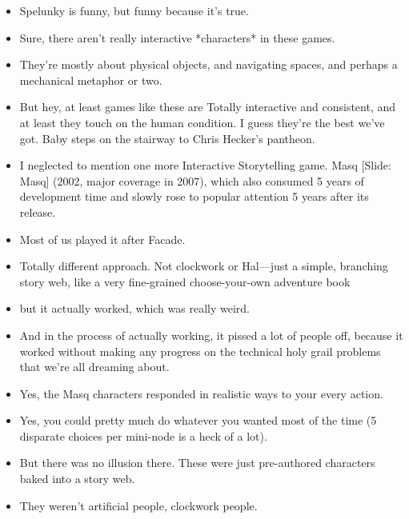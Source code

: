 \documentclass[12pt]{article}
\begin{document}
{\begin{itemize}
\item Spelunky is funny, but funny because it's true.

\item Sure, there aren't really interactive *characters* in these games.  

\item They're mostly about physical objects, and navigating spaces, and perhaps a mechanical metaphor or two.  

\item But hey, at least games like these are Totally interactive and consistent, and at least they touch on the human condition.  I guess they're the best we've got.  Baby steps on the stairway to Chris Hecker's pantheon.



\item I neglected to mention one more Interactive Storytelling game.  Masq [Slide: Masq] (2002, major coverage in 2007), which also consumed 5 years of development time and slowly rose to popular attention 5 years after its release.  

\item Most of us played it after Facade.  

\item Totally different approach.  Not clockwork or Hal---just a simple, branching story web, like a very fine-grained choose-your-own adventure book

\item but it actually worked, which was really weird.  

\item And in the process of actually working, it pissed a lot of people off, because it worked without making any progress on the technical holy grail problems that we're all dreaming about.

\item Yes, the Masq characters responded in realistic ways to your every action.

\item Yes, you could pretty much do whatever you wanted most of the time (5 disparate choices per mini-node is a heck of a lot).  

\item But there was no illusion there.  These were just pre-authored characters baked into a story web.  

\item They weren't artificial people, clockwork people.


\end{itemize}}
\end{document}
